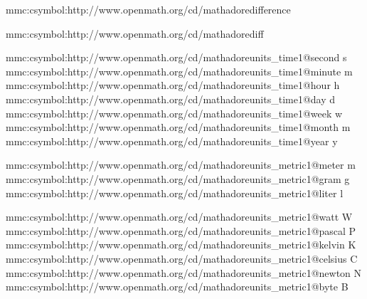 \startsetups mmc:csymbol:http://www.openmath.org/cd/mathadore difference
    \MMLcreset
    \Delta\getXMLstackdata\plustwo
\stopsetups


\startsetups mmc:csymbol:http://www.openmath.org/cd/mathadore diff
    \MMLcreset
     {
        \getXMLstackdata\plusthree
    }
\stopsetups


\startsetups mmc:csymbol:http://www.openmath.org/cd/mathadore units_time1@second        {\mr s}\stopsetups
\startsetups mmc:csymbol:http://www.openmath.org/cd/mathadore units_time1@minute        {\mr m}\stopsetups
\startsetups mmc:csymbol:http://www.openmath.org/cd/mathadore units_time1@hour          {\mr h}\stopsetups
\startsetups mmc:csymbol:http://www.openmath.org/cd/mathadore units_time1@day           {\mr d}\stopsetups
\startsetups mmc:csymbol:http://www.openmath.org/cd/mathadore units_time1@week          {\mr w}\stopsetups
\startsetups mmc:csymbol:http://www.openmath.org/cd/mathadore units_time1@month         {\mr m}\stopsetups
\startsetups mmc:csymbol:http://www.openmath.org/cd/mathadore units_time1@year          {\mr y}\stopsetups

\startsetups mmc:csymbol:http://www.openmath.org/cd/mathadore units_metric1@meter       {\mr m}\stopsetups
\startsetups mmc:csymbol:http://www.openmath.org/cd/mathadore units_metric1@gram        {\mr g}\stopsetups
\startsetups mmc:csymbol:http://www.openmath.org/cd/mathadore units_metric1@liter       {\mr l}\stopsetups

\startsetups mmc:csymbol:http://www.openmath.org/cd/mathadore units_metric1@watt        {\mr W}\stopsetups
\startsetups mmc:csymbol:http://www.openmath.org/cd/mathadore units_metric1@pascal      {\mr P}\stopsetups
\startsetups mmc:csymbol:http://www.openmath.org/cd/mathadore units_metric1@kelvin      {\mr K}\stopsetups
\startsetups mmc:csymbol:http://www.openmath.org/cd/mathadore units_metric1@celsius     {\mr C}\stopsetups
\startsetups mmc:csymbol:http://www.openmath.org/cd/mathadore units_metric1@newton      {\mr N}\stopsetups
\startsetups mmc:csymbol:http://www.openmath.org/cd/mathadore units_metric1@byte        {\mr B}\stopsetups

